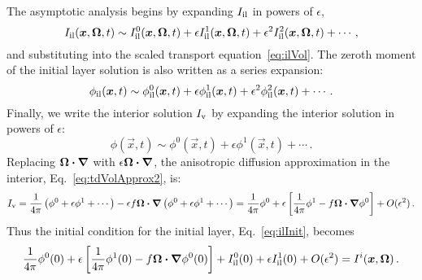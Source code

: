 The asymptotic analysis begins by expanding $I_\mathrm{il}$ in powers of $\epsilon$,
\begin{equation*}
  I_\mathrm{il}(\bm{x},\bm{\Omega},t) \sim I_\mathrm{il}^{0}(\bm{x},\bm{\Omega},t)
  + \epsilon I_\mathrm{il}^{1}(\bm{x},\bm{\Omega},t)
  + \epsilon^2 I_\mathrm{il}^{2}(\bm{x},\bm{\Omega},t)
  + \cdots\,,
\end{equation*}
and substituting into the scaled transport equation~\eqref{eq:ilVol}. The zeroth
moment of the
initial layer solution is also written as a series expansion:
\begin{equation*}
  \phi_\mathrm{il}(\bm{x},t) \sim \phi_\mathrm{il}^{0}(\bm{x},t)
  + \epsilon \phi_\mathrm{il}^{1}(\bm{x},t)
  + \epsilon^2 \phi_\mathrm{il}^{2}(\bm{x},t)
  + \cdots\,.
\end{equation*}
Finally, we write the interior solution $I_\mathrm{v}$ by expanding the interior solution
in powers of $\epsilon$:
\begin{equation*}
  \phi(\vec{x},t) \sim \phi^{0}(\vec{x},t)
  + \epsilon \phi^{1}(\vec{x},t)
  + \cdots\,.
\end{equation*}
Replacing $\bm{\Omega}\bm{\cdot}\bm{\nabla}$ with $\epsilon \bm{\Omega}\bm{\cdot}\bm{\nabla}$, the
anisotropic diffusion approximation in the interior,
Eq.~\eqref{eq:tdVolApprox2}, is:
\begin{equation*}
  I_\mathrm{v}
  = \frac{1}{4\pi} \left( \phi^{0} + \epsilon \phi^{1} + \cdots\right)
  - \epsilon f \bm{\Omega} \bm{\cdot} \bm{\nabla} \left( \phi^{0}
    + \epsilon \phi^{1} + \cdots\right)
  = \frac{1}{4\pi} \phi^{0} + \epsilon \left[ \frac{1}{4\pi} \phi^{1}
    - f \bm{\Omega} \bm{\cdot} \bm{\nabla} \phi^{0} \right] + O(\epsilon^2)\,.
\end{equation*}
Thus the initial condition for the initial layer, Eq.~\eqref{eq:ilInit},
becomes
\begin{equation}\label{eq:ilInit2}
 \frac{1}{4\pi} \phi^{0}(0) + \epsilon \left[ \frac{1}{4\pi} \phi^{1}(0)
    - f \bm{\Omega} \bm{\cdot} \bm{\nabla} \phi^{0}(0) \right] 
    + I_\mathrm{il}^{0}(0) + \epsilon  I_\mathrm{il}^{1}(0) + O(\epsilon^2)
 = I^i(\bm{x},\bm{\Omega})\,.
\end{equation}

